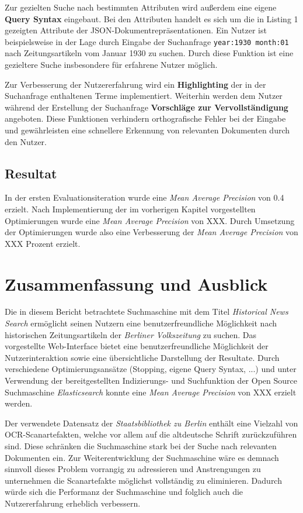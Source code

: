 \documentclass[11pt,a4paper, halfparskip]{scrartcl}
\begin{document}
Zur gezielten Suche nach bestimmten Attributen wird außerdem eine eigene \textbf{Query Syntax} eingebaut. 
Bei den Attributen handelt es sich um die in Listing 1 gezeigten Attribute der JSON-Dokumentrepräsentationen.
Ein Nutzer ist beispielsweise in der Lage durch Eingabe der Suchanfrage \texttt{year:1930 month:01} nach Zeitungsartikeln vom Januar 1930 zu suchen.
Durch diese Funktion ist eine gezieltere Suche insbesondere für erfahrene Nutzer möglich.

Zur Verbesserung der Nutzererfahrung wird ein \textbf{Highlighting} der in der Suchanfrage enthaltenen Terme implementiert.
Weiterhin werden dem Nutzer während der Erstellung der Suchanfrage \textbf{Vorschläge zur Vervollständigung} angeboten.
Diese Funktionen verhindern orthografische Fehler bei der Eingabe und gewährleisten eine schnellere Erkennung von relevanten Dokumenten durch den Nutzer.

\subsection{Resultat}

In der ersten Evaluationsiteration wurde eine \textit{Mean Average Precision} von 0.4 erzielt.
Nach Implementierung der im vorherigen Kapitel vorgestellten Optimierungen wurde eine \textit{Mean Average Precision} von XXX.
Durch Umsetzung der Optimierungen wurde also eine Verbesserung der \textit{Mean Average Precision} von XXX Prozent erzielt. 

\section{Zusammenfassung und Ausblick}

Die in diesem Bericht betrachtete Suchmaschine mit dem Titel \textit{Historical News Search} ermöglicht seinen Nutzern eine benutzerfreundliche Möglichkeit nach historischen Zeitungsartikeln der \textit{Berliner Volkszeitung} zu suchen.
Das vorgestellte Web-Interface bietet eine benutzerfreundliche Möglichkeit der Nutzerinteraktion sowie eine übersichtliche Darstellung der Resultate.
Durch verschiedene Optimierungsansätze (Stopping, eigene Query Syntax, ...) und unter Verwendung der bereitgestellten Indizierungs- und Suchfunktion der Open Source Suchmaschine \textit{Elasticsearch} konnte eine \textit{Mean Average Precision} von XXX erzielt werden.

Der verwendete Datensatz der \textit{Staatsbibliothek zu Berlin} enthält eine Vielzahl von OCR-Scanartefakten, welche vor allem auf die altdeutsche Schrift zurückzuführen sind.
Diese schränken die Suchmaschine stark bei der Suche nach relevanten Dokumenten ein. 
Zur Weiterentwicklung der Suchmaschine wäre es demnach sinnvoll dieses Problem vorrangig zu adressieren und Anstrengungen zu unternehmen die Scanartefakte möglichst vollständig zu eliminieren.
Dadurch würde sich die Performanz der Suchmaschine und folglich auch die Nutzererfahrung erheblich verbessern.
\end{document}

